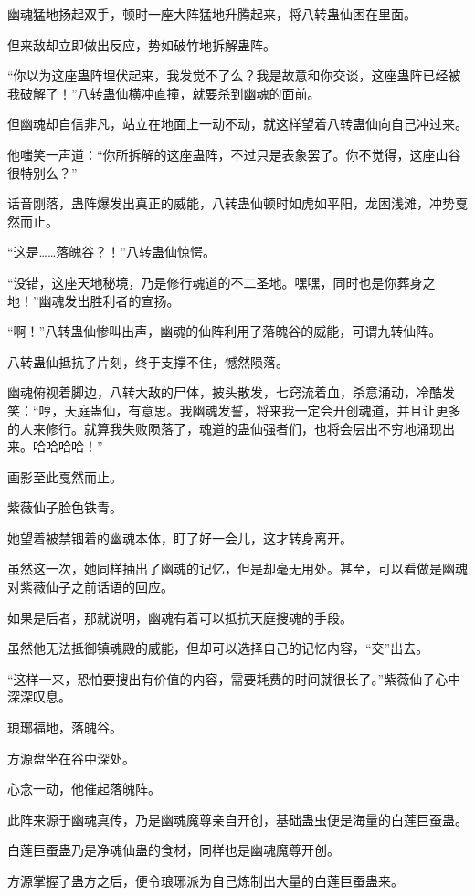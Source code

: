 \begin{this_body}
幽魂猛地扬起双手，顿时一座大阵猛地升腾起来，将八转蛊仙困在里面。

但来敌却立即做出反应，势如破竹地拆解蛊阵。

“你以为这座蛊阵埋伏起来，我发觉不了么？我是故意和你交谈，这座蛊阵已经被我破解了！”八转蛊仙横冲直撞，就要杀到幽魂的面前。

但幽魂却自信非凡，站立在地面上一动不动，就这样望着八转蛊仙向自己冲过来。

他嗤笑一声道：“你所拆解的这座蛊阵，不过只是表象罢了。你不觉得，这座山谷很特别么？”

话音刚落，蛊阵爆发出真正的威能，八转蛊仙顿时如虎如平阳，龙困浅滩，冲势戛然而止。

“这是……落魄谷？！”八转蛊仙惊愕。

“没错，这座天地秘境，乃是修行魂道的不二圣地。嘿嘿，同时也是你葬身之地！”幽魂发出胜利者的宣扬。

“啊！”八转蛊仙惨叫出声，幽魂的仙阵利用了落魄谷的威能，可谓九转仙阵。

八转蛊仙抵抗了片刻，终于支撑不住，憾然陨落。

幽魂俯视着脚边，八转大敌的尸体，披头散发，七窍流着血，杀意涌动，冷酷发笑：“哼，天庭蛊仙，有意思。我幽魂发誓，将来我一定会开创魂道，并且让更多的人来修行。就算我失败陨落了，魂道的蛊仙强者们，也将会层出不穷地涌现出来。哈哈哈哈！”

画影至此戛然而止。

紫薇仙子脸色铁青。

她望着被禁锢着的幽魂本体，盯了好一会儿，这才转身离开。

虽然这一次，她同样抽出了幽魂的记忆，但是却毫无用处。甚至，可以看做是幽魂对紫薇仙子之前话语的回应。

如果是后者，那就说明，幽魂有着可以抵抗天庭搜魂的手段。

虽然他无法抵御镇魂殿的威能，但却可以选择自己的记忆内容，“交”出去。

“这样一来，恐怕要搜出有价值的内容，需要耗费的时间就很长了。”紫薇仙子心中深深叹息。

琅琊福地，落魄谷。

方源盘坐在谷中深处。

心念一动，他催起落魄阵。

此阵来源于幽魂真传，乃是幽魂魔尊亲自开创，基础蛊虫便是海量的白莲巨蚕蛊。

白莲巨蚕蛊乃是净魂仙蛊的食材，同样也是幽魂魔尊开创。

方源掌握了蛊方之后，便令琅琊派为自己炼制出大量的白莲巨蚕蛊来。


\end{this_body}
